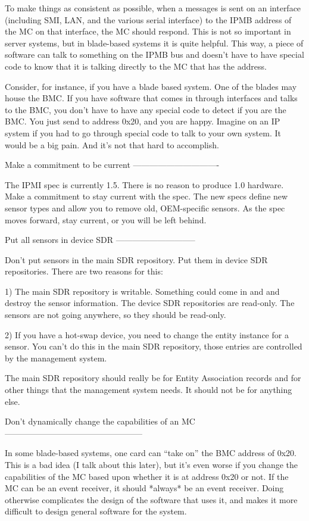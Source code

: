 To make things as consistent as possible, when a messages is sent on
an interface (including SMI, LAN, and the various serial interface) to
the IPMB address of the MC on that interface, the MC should respond.
This is not so important in server systems, but in blade-based systems
it is quite helpful.  This way, a piece of software can talk to
something on the IPMB bus and doesn't have to have special code to
know that it is talking directly to the MC that has the address.

Consider, for instance, if you have a blade based system.  One of the
blades may house the BMC.  If you have software that comes in through
interfaces and talks to the BMC, you don't have to have any special
code to detect if you are the BMC.  You just send to address 0x20, and
you are happy.  Imagine on an IP system if you had to go through
special code to talk to your own system.  It would be a big pain.  And
it's not that hard to accomplish.


Make a commitment to be current
-------------------------------

The IPMI spec is currently 1.5.  There is no reason to produce 1.0
hardware.  Make a commitment to stay current with the spec.  The new
specs define new sensor types and allow you to remove old,
OEM-specific sensors.  As the spec moves forward, stay current, or you
will be left behind.


Put all sensors in device SDR
-----------------------------

Don't put sensors in the main SDR repository.  Put them in device SDR
repositories.  There are two reasons for this:

1) The main SDR repository is writable.  Something could come in and
   and destroy the sensor information.  The device SDR repositories
   are read-only.  The sensors are not going anywhere, so they should
   be read-only.

2) If you have a hot-swap device, you need to change the entity
   instance for a sensor.  You can't do this in the main SDR
   repository, those entries are controlled by the management system.

The main SDR repository should really be for Entity Association
records and for other things that the management system needs.  It
should not be for anything else.


Don't dynamically change the capabilities of an MC
--------------------------------------------------

In some blade-based systems, one card can ``take on'' the BMC address
of 0x20.  This is a bad idea (I talk about this later), but it's even
worse if you change the capabilities of the MC based upon whether it
is at address 0x20 or not.  If the MC can be an event receiver, it
should *always* be an event receiver.  Doing otherwise complicates the
design of the software that uses it, and makes it more difficult to
design general software for the system.


